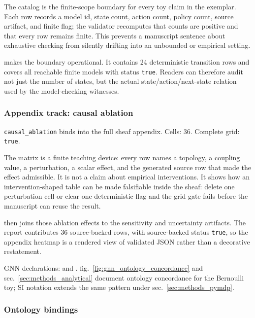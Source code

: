 \documentclass[
  english,
]{article}
\begin{document}
The catalog is the finite-scope boundary for every toy claim in the
exemplar. Each row records a model id, state count, action count, policy
count, source artifact, and finite flag; the validator recomputes that
counts are positive and that every row remains finite. This prevents a
manuscript sentence about exhaustive checking from silently drifting
into an unbounded or empirical setting.

 makes the boundary
operational. It contains 24 deterministic transition rows and covers all
reachable finite models with status \texttt{true}. Readers can therefore
audit not just the number of states, but the actual
state/action/next-state relation used by the model-checking witnesses.

\subsubsection{Appendix track: causal
ablation}\label{appendix-track-causal-ablation}

\texttt{causal\_ablation} binds
 into the full sheaf
appendix. Cells: 36. Complete grid: \texttt{true}.

The matrix is a finite teaching device: every row names a topology, a
coupling value, a perturbation, a scalar effect, and the generated
source row that made the effect admissible. It is not a claim about
empirical interventions. It shows how an intervention-shaped table can
be made falsifiable inside the sheaf: delete one perturbation cell or
clear one deterministic flag and the grid gate fails before the
manuscript can reuse the result.

 then joins
those ablation effects to the sensitivity and uncertainty artifacts. The
report contributes 36 source-backed rows, with source-backed status
\texttt{true}, so the appendix heatmap is a rendered view of validated
JSON rather than a decorative restatement.

GNN declarations:  and
 \citep{gnn2023}.
fig.~\ref{fig:gnn_ontology_concordance} and
sec.~\ref{sec:methods_analytical} document ontology concordance for the
Bernoulli toy; SI notation extends the same pattern under
sec.~\ref{sec:methods_pymdp}.

\subsubsection{Ontology bindings}\label{ontology-bindings-4}
\end{document}
